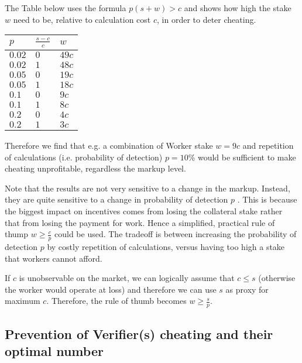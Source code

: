 \documentclass{article}
\begin{document}
The Table below uses the formula $p(s+w)>c$ and shows how high the stake $w$
need to be, relative to calculation cost $c$, in order to deter cheating.

\begin{tabular}{||l|l|l||}
\hline\hline
$p$ & $\frac{s-c}{c}$ & $w$ \\ \hline
$0.02$ & $0$ & $49c$ \\ \hline
$0.02$ & $1$ & $48c$ \\ \hline
$0.05$ & $0$ & $19c$ \\ \hline
$0.05$ & $1$ & $18c$ \\ \hline
$0.1$ & $0$ & $9c$ \\ \hline
$0.1$ & $1$ & $8c$ \\ \hline
$0.2$ & $0$ & $4c$ \\ \hline
$0.2$ & $1$ & $3c$ \\ \hline\hline
\end{tabular}

Therefore we find that e.g. a combination of Worker stake $w=9c$ and
repetition of calculations (i.e. probability of detection) $p=10\%$ would be
sufficient to make cheating unprofitable, regardless the markup level.

Note that the results are not very sensitive to a change in the markup.
Instead, they are quite sensitive to a change in probability of detection $p$%
. This is because the biggest impact on incentives comes from losing the
collateral stake rather that from losing the payment for work. Hence a
simplified, practical rule of thump $w\geq \frac{c}{p}$ could be used. The
tradeoff is between increasing the probability of detection $p$ by costly
repetition of calculations, versus having too high a stake that workers
cannot afford.

If $c$ is unobservable on the market, we can logically assume that $c\leq s$
(otherwise the worker would operate at loss) and therefore we can use $s$ as
proxy for maximum $c$. Therefore, the rule of thumb becomes $w\geq \frac{s}{p%
}$.

\subsection{Prevention of Verifier(s) cheating and their optimal number}
\end{document}
